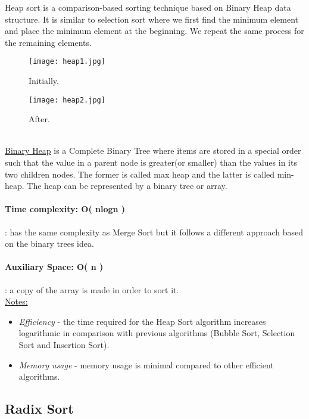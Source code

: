 \documentclass{article}
\begin{document}
Heap sort is a comparison-based sorting technique based on Binary Heap data
structure. It is similar to selection sort where we first find the minimum element and
place the minimum element at the beginning. We repeat the same process for the
remaining elements.


\begin{figure}[h!]
\centering
\texttt{[image: heap1.jpg]}
\caption{\label{fig:heap1} Initially.}
\end{figure}

\hline

\begin{figure}[h!]
\centering
\texttt{[image: heap2.jpg]}
\caption{\label{fig:heap2} After.}
\end{figure}

\hfill \break \\
\underline{Binary Heap} is a Complete Binary Tree where items are stored in a special order such
that the value in a parent node is greater(or smaller) than the values in its two children
nodes. The former is called max heap and the latter is called min-heap. The heap can
be represented by a binary tree or array.
\paragraph{Time complexity: O( nlogn )}: has the same complexity as Merge Sort but it follows a different approach based on the binary trees idea.

\paragraph{Auxiliary Space: O( n )}: a copy of the array is made in order to sort it.\hfill \break \\

\noindent\underline{Notes:}
\begin{itemize}
    \item \emph{Efficiency} - the time required for the Heap Sort algorithm increases logarithmic in comparison with previous algorithms (Bubble Sort, Selection Sort and Insertion Sort).
    \item \emph{Memory usage} - memory usage is minimal compared to other efficient algorithms.
\end{itemize}


\subsection{Radix Sort}
\end{document}
